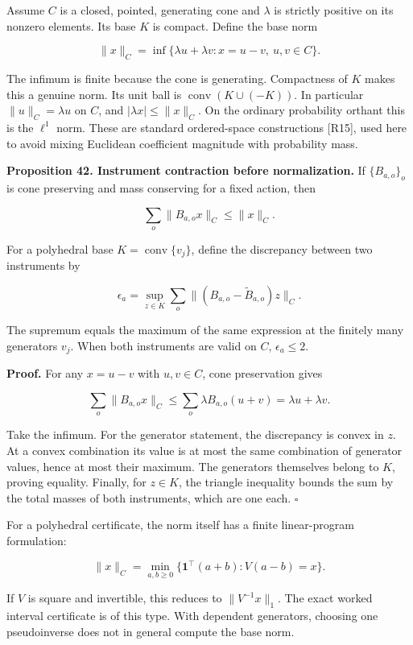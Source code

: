 Assume \(C\) is a closed, pointed, generating cone and \(\lambda\) is
strictly positive on its nonzero elements. Its base \(K\) is compact.
Define the base norm

\[
\|x\|_C=\inf\{\lambda u+\lambda v:x=u-v,\ u,v\in C\}.
\]

The infimum is finite because the cone is generating. Compactness of
\(K\) makes this a genuine norm. Its unit ball is
\(\operatorname{conv}(K\cup(-K))\). In particular \(\|u\|_C=\lambda u\)
on \(C\), and \(|\lambda x|\leq\|x\|_C\). On the ordinary probability
orthant this is the \(\ell^1\) norm. These are standard ordered-space
constructions {[}R15{]}, used here to avoid mixing Euclidean coefficient
magnitude with probability mass.

\textbf{Proposition 42. Instrument contraction before normalization.} If
\(\{B_{a,o}\}_o\) is cone preserving and mass conserving for a fixed
action, then

\[
\boxed{\sum_o\|B_{a,o}x\|_C\leq\|x\|_C.}
\]

For a polyhedral base \(K=\operatorname{conv}\{v_j\}\), define the
discrepancy between two instruments by

\[
\epsilon_a=\sup_{z\in K}\sum_o
\|(B_{a,o}-\widetilde B_{a,o})z\|_C.
\]

The supremum equals the maximum of the same expression at the finitely
many generators \(v_j\). When both instruments are valid on \(C\),
\(\epsilon_a\leq2\).

\textbf{Proof.} For any \(x=u-v\) with \(u,v\in C\), cone preservation
gives

\[
\sum_o\|B_{a,o}x\|_C
\leq\sum_o\lambda B_{a,o}(u+v)
=\lambda u+\lambda v.
\]

Take the infimum. For the generator statement, the discrepancy is convex
in \(z\). At a convex combination its value is at most the same
combination of generator values, hence at most their maximum. The
generators themselves belong to \(K\), proving equality. Finally, for
\(z\in K\), the triangle inequality bounds the sum by the total masses
of both instruments, which are one each. \(\square\)

For a polyhedral certificate, the norm itself has a finite
linear-program formulation:

\[
\|x\|_C=\min_{a,b\geq0}
\{\mathbf1^\top(a+b):V(a-b)=x\}.
\]

If \(V\) is square and invertible, this reduces to \(\|V^{-1}x\|_1\).
The exact worked interval certificate is of this type. With dependent
generators, choosing one pseudoinverse does not in general compute the
base norm.

